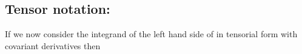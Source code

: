 \subsection{Tensor notation:}
If we now consider the integrand of the left hand side of
 in tensorial form with covariant
derivatives then
% 
% 
% 
